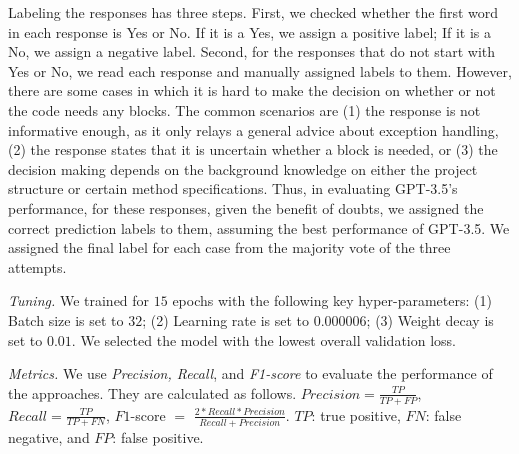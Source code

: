 Labeling the responses has three steps. First, we checked whether the
first word in each response is Yes or No. If it is a Yes, we assign a
positive label; If it is a No, we assign a negative label. Second, for
the responses that do not start with Yes or No, we read each response
and manually assigned labels to them. However, there are some cases in
which it is hard to make the decision on whether or not the code needs
any  blocks. The common scenarios are (1) the response
is not informative enough, as it only relays a general advice about
exception handling, (2) the response states that it is uncertain
whether a
 block is needed, or (3) the decision making depends on the
background knowledge on either the project structure or certain method
specifications. Thus, in evaluating GPT-3.5's performance, for
these responses, given the benefit of doubts, we assigned the correct
prediction labels to them, assuming the best performance of GPT-3.5.
We assigned the final label for each case from the majority
vote of the three attempts.



{\em Tuning.} We trained {\tool} for $15$ epochs with the following key hyper-parameters: (1) Batch size is set to $32$; (2) Learning rate is set to $0.000006$; (3) Weight decay is set to $0.01$. We selected the model with the lowest overall validation loss.


{\em Metrics.} We use \emph{Precision, Recall}, and {\em F1-score} to
evaluate the performance of the approaches. They are calculated as follows.
$Precision = \frac{TP}{TP+FP}$, $Recall = \frac{TP}{TP+FN}$, $F1$-score
$=$ $\frac{2*Recall*Precision}{Recall+Precision}$. $TP$: true
positive, $FN$: false negative, and $FP$: false positive.
